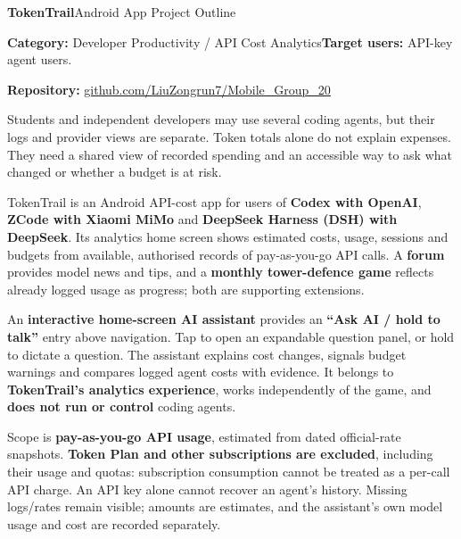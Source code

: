 \documentclass[11pt,a4paper]{article}
\newcommand{\sect}[1]{\vspace{3pt}{\large\bfseries#1}\par\vspace{1pt}}
\begin{document}
\color{black}

{\fontsize{22}{26}\selectfont\bfseries TokenTrail}\hfill{\normalsize Android App Project Outline}\par
{}\vspace{4pt}
\textbf{Category:} Developer Productivity / API Cost Analytics\hfill\textbf{Target users:} API-key agent users.
\par\textbf{Repository:} \href{https://github.com/LiuZongrun7/Mobile_Group_20}{github.com/LiuZongrun7/Mobile\_Group\_20}

\sect{1. App idea and user problem}
Students and independent developers may use several coding agents, but their logs and provider views are separate. Token totals alone do not explain expenses. They need a shared view of recorded spending and an accessible way to ask what changed or whether a budget is at risk.

TokenTrail is an Android API-cost app for users of \textbf{Codex with OpenAI}, \textbf{ZCode with Xiaomi MiMo} and \textbf{DeepSeek Harness (DSH) with DeepSeek}. Its analytics home screen shows estimated costs, usage, sessions and budgets from available, authorised records of pay-as-you-go API calls. A \textbf{forum} provides model news and tips, and a \textbf{monthly tower-defence game} reflects already logged usage as progress; both are supporting extensions.

An \textbf{interactive home-screen AI assistant} provides an \textbf{``Ask AI / hold to talk''} entry above navigation. Tap to open an expandable question panel, or hold to dictate a question. The assistant explains cost changes, signals budget warnings and compares logged agent costs with evidence. It belongs to \textbf{TokenTrail's analytics experience}, works independently of the game, and \textbf{does not run or control} coding agents.

Scope is \textbf{pay-as-you-go API usage}, estimated from dated official-rate snapshots. \textbf{Token Plan and other subscriptions are excluded}, including their usage and quotas: subscription consumption cannot be treated as a per-call API charge. An API key alone cannot recover an agent's history. Missing logs/rates remain visible; amounts are estimates, and the assistant's own model usage and cost are recorded separately.
\end{document}
